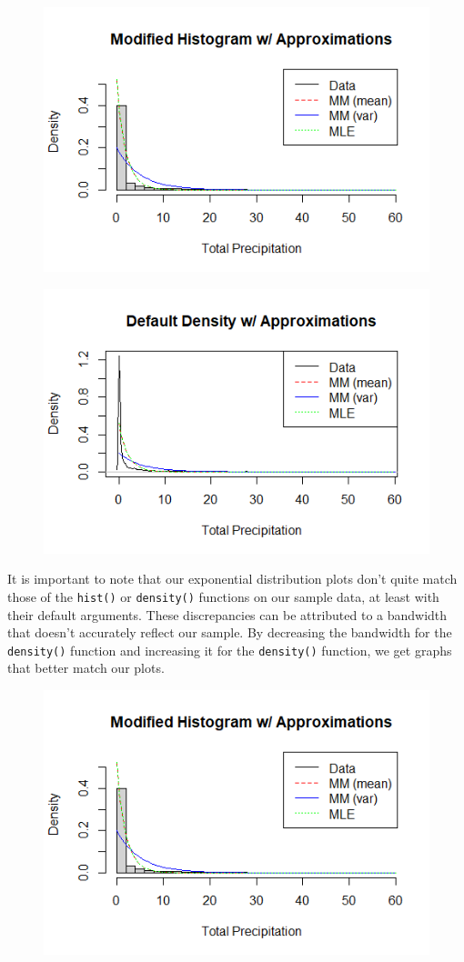 \documentclass[12pt, a4paper, oneside]{report}
\begin{document}
\begin{figure}[h]
  \centering
  \includegraphics[width=0.8\linewidth]{expHistModifiedA.png}
\end{figure}

\begin{figure}[h]
  \centering
  \includegraphics[width=0.8\linewidth]{expDensityDefaultA.png}
\end{figure}

\newpage
It is important to note that our exponential distribution plots don't quite match those of the \lstinline{hist()} or \lstinline{density()} functions on our sample data, at least with their default arguments. These discrepancies can be attributed to a bandwidth that doesn't accurately reflect our sample. 
By decreasing the bandwidth for the \lstinline{density()} function and increasing it for the \lstinline{density()} function, we get graphs that better match our plots.



\begin{figure}[h]
  \centering
  \includegraphics[width=0.8\linewidth]{expHistModifiedA.png}
\end{figure}
\end{document}
